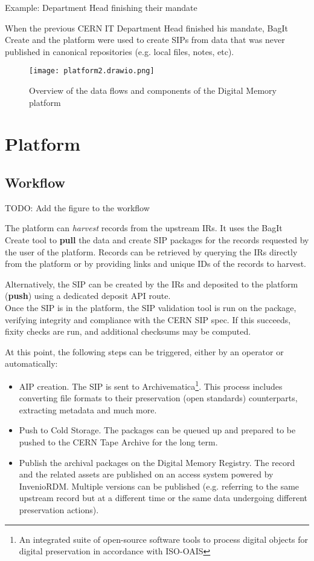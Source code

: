 \documentclass[11pt]{IEEEtran}
\begin{document}
\par{Example: Department Head finishing their mandate}

When the previous CERN IT Department Head finished his mandate, BagIt Create and the platform were used to create SIPs from data that was never published in canonical repositories (e.g. local files, notes, etc).

\begin{figure*}
  \texttt{[image: platform2.drawio.png]}
  \caption{Overview of the data flows and components of the Digital Memory platform}
\end{figure*}



\section{Platform}

\subsection{Workflow}

TODO: Add the figure to the workflow

The platform can \textit{harvest} records from the upstream IRs. It uses the BagIt Create tool to \textbf{pull} the data and create SIP packages for the records requested by the user of the platform. Records can be retrieved by querying the IRs directly from the platform or by providing links and unique IDs of the records to harvest.

Alternatively, the SIP can be created by the IRs and deposited to the platform (\textbf{push}) using a dedicated deposit API route.
\\

Once the SIP is in the platform, the SIP validation tool is run on the package, verifying integrity and compliance with the CERN SIP spec. If this succeeds, fixity checks are run, and additional checksums may be computed.

At this point, the following steps can be triggered, either by an operator or automatically:

\begin{itemize}
    \item AIP creation. The SIP is sent to Archivematica\footnote{An integrated suite\cite{Archivematica} of open-source software tools to process digital objects for digital preservation in accordance with ISO-OAIS}. This process includes converting file formats to their preservation (open standards) counterparts, extracting metadata and much more.
    \item Push to Cold Storage. The packages can be queued up and prepared to be pushed to the CERN Tape Archive for the long term.
    \item Publish the archival packages on the Digital Memory Registry. The record and the related assets are published on an access system powered by InvenioRDM. Multiple versions can be published (e.g. referring to the same upstream record but at a different time or the same data undergoing different preservation actions).
\end{itemize}
\end{document}

